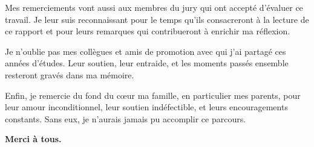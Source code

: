 \vspace{0.5cm}

Mes remerciements vont aussi aux membres du jury qui ont accepté d'évaluer ce travail. Je leur suis reconnaissant pour le temps qu'ils consacreront à la lecture de ce rapport et pour leurs remarques qui contribueront à enrichir ma réflexion.

\vspace{0.5cm}

Je n'oublie pas mes collègues et amis de promotion avec qui j'ai partagé ces années d'études. Leur soutien, leur entraide, et les moments passés ensemble resteront gravés dans ma mémoire.

\vspace{0.5cm}

Enfin, je remercie du fond du cœur ma famille, en particulier mes parents, pour leur amour inconditionnel, leur soutien indéfectible, et leurs encouragements constants. Sans eux, je n'aurais jamais pu accomplir ce parcours.

\vspace{1cm}

\begin{flushright}
\textbf{Merci à tous.}
\end{flushright}
